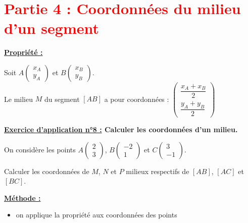 \documentclass[12pt]{article}
\newcommand*{\Coord}[2]{%
  \ensuremath{
    \begin{pmatrix} 
      #1\\ 
      #2 
    \end{pmatrix}}}
\begin{document}

\section*{\textcolor{red}{Partie 4 : Coordonnées du milieu d'un segment}}

\vspace{5pt}

\begin{mdframed}[
    linewidth=1pt,
    roundcorner=5pt,
    linecolor=Red,
    innertopmargin=10pt,
    innerbottommargin=10pt
]
{\color{Red}\textbf{\underline{Propriété :}}}

\vspace{5pt}
Soit $A\Coord{x_A}{y_A}$ et $B\Coord{x_B}{y_B}$.
\\Le milieu $M$ du segment $\left[AB\right]$ a pour 
coordonnées : $\renewcommand*{\arraystretch}{2}\begin{pmatrix} 
      \dfrac{x_A+x_B}{2}\\
      \dfrac{y_A+y_B}{2}
    \end{pmatrix}$
\end{mdframed}

\vspace{5pt}

\begin{mdframed}[
    linewidth=1pt,
    roundcorner=5pt,
    linecolor=RoyalBlue,
    innertopmargin=10pt,
    innerbottommargin=10pt
]
{\color{RoyalBlue}\textbf{\underline{Exercice d'application n°8 :} 
Calculer les coordonnées d'un milieu.}}
\vspace{5pt}

On considère les points $A\Coord{2}{3}$, $B\Coord{-2}{1}$ et $C\Coord{3}{-1}$.

\vspace{5pt}
Calculer les coordonnées de $M$, $N$ et $P$ milieux respectifs de 
$\left[AB\right]$, $\left[AC\right]$ et $\left[BC\right]$.

\begin{mdframed}[
    linewidth=1pt,
    roundcorner=5pt,
    linecolor=black,
    innertopmargin=10pt,
    innerbottommargin=10pt,
    backgroundcolor=gray!15
]
\underline{\textbf{Méthode :}}
\begin{itemize}
    \item on applique la propriété aux coordonnées des points
\end{itemize}
\end{mdframed}

\end{mdframed}
\end{document}
